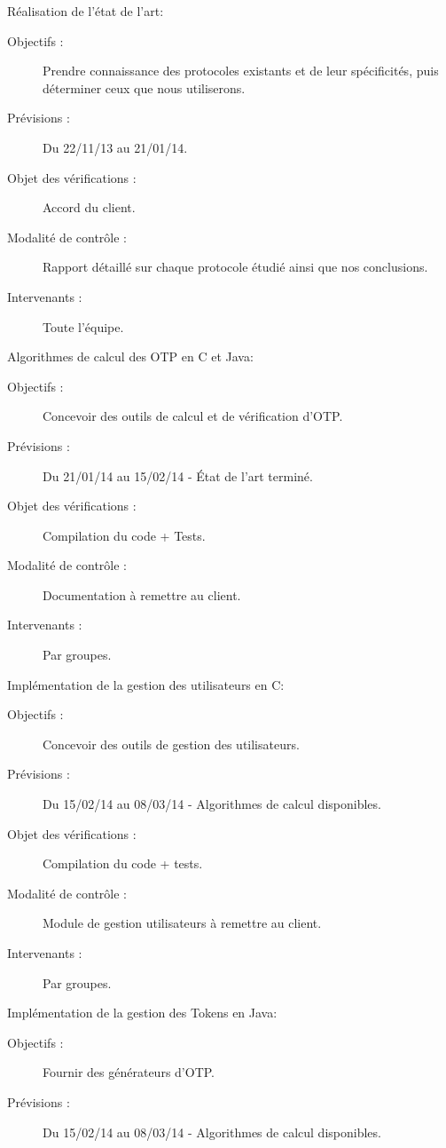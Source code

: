 \documentclass{../../res/univ-projet}
\begin{document}
\begin{description}
	\item Réalisation de l'état de l'art:
	\begin{description}
		\item[Objectifs :] Prendre connaissance des protocoles existants et de leur spécificités, puis déterminer ceux que nous utiliserons.
		\item[Prévisions :] Du 22/11/13 au 21/01/14.
		\item[Objet des vérifications :] Accord du client.
		\item[Modalité de contrôle :] Rapport détaillé sur chaque protocole étudié ainsi que nos conclusions.
		\item[Intervenants :] Toute l'équipe.
	\end{description}
	\vfill
	\item Algorithmes de calcul des OTP en C et Java:
	\begin{description}
		\item[Objectifs :] Concevoir des outils de calcul et de vérification d'OTP.
		\item[Prévisions :] Du 21/01/14 au 15/02/14 - État de l'art terminé.
		\item[Objet des vérifications :] Compilation du code + Tests.
		\item[Modalité de contrôle :] Documentation à remettre au client.
		\item[Intervenants :] Par groupes.
	\end{description}
	\vfill
	\item Implémentation de la gestion des utilisateurs en C:
	\begin{description}
		\item[Objectifs :] Concevoir des outils de gestion des utilisateurs.
		\item[Prévisions :] Du 15/02/14 au 08/03/14 - Algorithmes de calcul disponibles.
		\item[Objet des vérifications :] Compilation du code + tests.
		\item[Modalité de contrôle :] Module de gestion utilisateurs à remettre au client.
		\item[Intervenants :] Par groupes.
	\end{description}
	\vfill
	\item Implémentation de la gestion des Tokens en Java:
	\begin{description}
		\item[Objectifs :] Fournir des générateurs d'OTP.
		\item[Prévisions :] Du 15/02/14 au 08/03/14 - Algorithmes de calcul disponibles.

\end{description}
\end{description}
\end{document}
